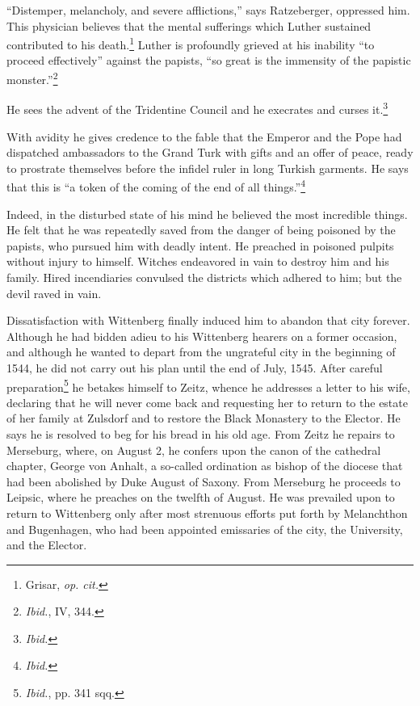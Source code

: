 “Distemper, melancholy, and severe afflictions,” says Ratzeberger,
oppressed him. This physician believes that the mental sufferings
which Luther sustained contributed to his death.\footnote{Grisar, \textit{op. cit.}}
 Luther is profoundly
grieved at his inability “to proceed effectively” against the
papists, “so great is the immensity of the papistic monster.”\footnote{\textit{Ibid.}, IV, 344.}

He sees the advent of the Tridentine Council and he execrates and curses
it.\footnote{\textit{Ibid.}}

With avidity he gives credence to the fable that the Emperor and
the Pope had dispatched ambassadors to the Grand Turk with gifts
and an offer of peace, ready to prostrate themselves before the infidel
ruler in long Turkish garments. He says that this is “a token of
the coming of the end of all things.”\footnote{\textit{Ibid.}}

Indeed, in the disturbed
state of his mind he believed the most incredible things. He felt that
he was repeatedly saved from the danger of being poisoned by the
papists, who pursued him with deadly intent. He preached in poisoned
pulpits without injury to himself. Witches endeavored in vain to
destroy him and his family. Hired incendiaries convulsed the districts
which adhered to him; but the devil raved in vain.

Dissatisfaction with Wittenberg finally induced him to abandon
that city forever. Although he had bidden adieu to his Wittenberg
hearers on a former occasion, and although he wanted to depart from
the ungrateful city in the beginning of 1544, he did not carry out
his plan until the end of July, 1545. After careful preparation\footnote{\textit{Ibid.}, pp. 341 sqq.}
 he
betakes himself to Zeitz, whence he addresses a letter to his wife, declaring
that he will never come back and requesting her to return to
the estate of her family at Zulsdorf and to restore the Black Monastery
to the Elector. He says he is resolved to beg for his bread in his old
age. From Zeitz he repairs to Merseburg, where, on August 2, he confers
upon the canon of the cathedral chapter, George von Anhalt, a
so-called ordination as bishop of the diocese that had been abolished
by Duke August of Saxony. From Merseburg he proceeds to Leipsic,
where he preaches on the twelfth of August. He was prevailed upon
to return to Wittenberg only after most strenuous efforts put forth
by Melanchthon and Bugenhagen, who had been appointed emissaries
of the city, the University, and the Elector.


